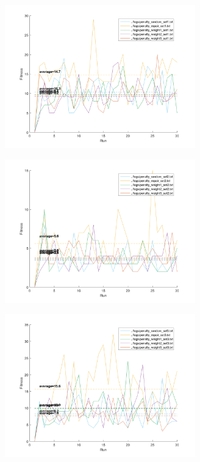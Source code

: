 \documentclass[11pt]{article}
\begin{document}
\begin{figure}[h]
\begin{minipage}{.5\textwidth}
  \includegraphics[width=3.25in]{assn1c_graph_penalty_set1.png}
  \label{fig:penaltyset1}
\end{minipage}%
\begin{minipage}{.5\textwidth}
  \includegraphics[width=3.25in]{assn1c_graph_penalty_set2.png}
  \label{fig:penaltyset2}
\end{minipage}
\end{figure}
\begin{figure}[h]
	\centering
  \includegraphics[width=3.25in]{assn1c_graph_penalty_set3.png}
  \label{fig:penaltyset3}
\end{figure}
\end{document}
